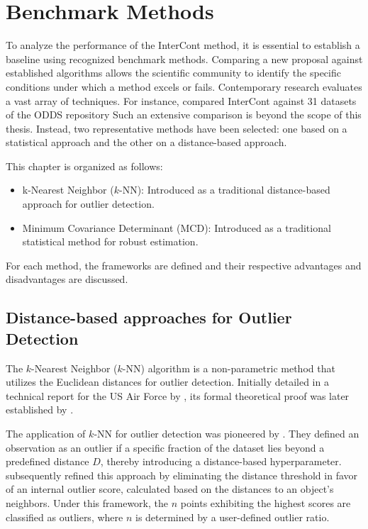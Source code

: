 \section{Benchmark Methods}\label{sec: benchmark_methods}
To analyze the performance of the InterCont method, it is essential to establish a baseline using recognized benchmark methods. 
Comparing a new proposal against established algorithms allows the scientific community to identify the specific conditions under which a method excels or fails. 
Contemporary research evaluates a vast array of techniques.
For instance, \citet{shenkar2022anomaly} compared InterCont against 31 datasets of the ODDS repository \citep[p. 7]{shenkar2022anomaly}
Such an extensive comparison is beyond the scope of this thesis. 
Instead, two representative methods have been selected: one based on a statistical approach and the other on a distance-based approach.


This chapter is organized as follows:

\begin{itemize}
    \item k-Nearest Neighbor ($k$-NN): Introduced as a traditional distance-based approach for outlier detection.
    \item Minimum Covariance Determinant (MCD): Introduced as a traditional statistical method for robust estimation.
\end{itemize}

For each method, the frameworks are defined and their respective advantages and disadvantages are discussed.


\subsection{Distance-based approaches for Outlier Detection}\label{sec:knn}
The $k$-Nearest Neighbor ($k$-NN) algorithm is a non-parametric method that utilizes the Euclidean distances for outlier detection. 
Initially detailed in a technical report for the US Air Force by \citet{fix1951discriminatory}, its formal theoretical proof was later established by \citet{1053964}.


The application of $k$-NN for outlier detection was pioneered by \citet{knox1998algorithms}. 
They defined an observation as an outlier if a specific fraction of the dataset lies beyond a predefined distance $D$, thereby introducing a distance-based hyperparameter. 
\citet{ramaswamy2000efficient} subsequently refined this approach by eliminating the distance threshold in favor of an internal outlier score, calculated based on the distances to an object's neighbors.
Under this framework, the $n$ points exhibiting the highest scores are classified as outliers, where $n$ is determined by a user-defined outlier ratio.


